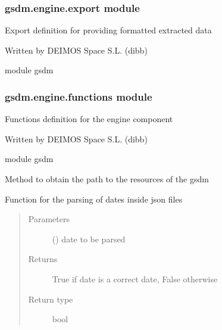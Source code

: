 \subsubsection{gsdm.engine.export module}
\label{\detokenize{gsdm.engine:module-gsdm.engine.export}}\label{\detokenize{gsdm.engine:gsdm-engine-export-module}}
Export definition for providing formatted extracted data

Written by DEIMOS Space S.L. (dibb)

module gsdm


\subsubsection{gsdm.engine.functions module}
\label{\detokenize{gsdm.engine:module-gsdm.engine.functions}}\label{\detokenize{gsdm.engine:gsdm-engine-functions-module}}
Functions definition for the engine component

Written by DEIMOS Space S.L. (dibb)

module gsdm

\begin{fulllineitems}
\label{\detokenize{gsdm.engine:gsdm.engine.functions.get_resources_path}}
Method to obtain the path to the resources of the gsdm

\end{fulllineitems}


\begin{fulllineitems}
\label{\detokenize{gsdm.engine:gsdm.engine.functions.is_datetime}}
Function for the parsing of dates inside json files
\begin{quote}\begin{description}
\item[{Parameters}] \leavevmode
{} () \textendash{} date to be parsed

\item[{Returns}] \leavevmode
True if date is a correct date, False otherwise

\item[{Return type}] \leavevmode
bool

\end{description}\end{quote}

\end{fulllineitems}

